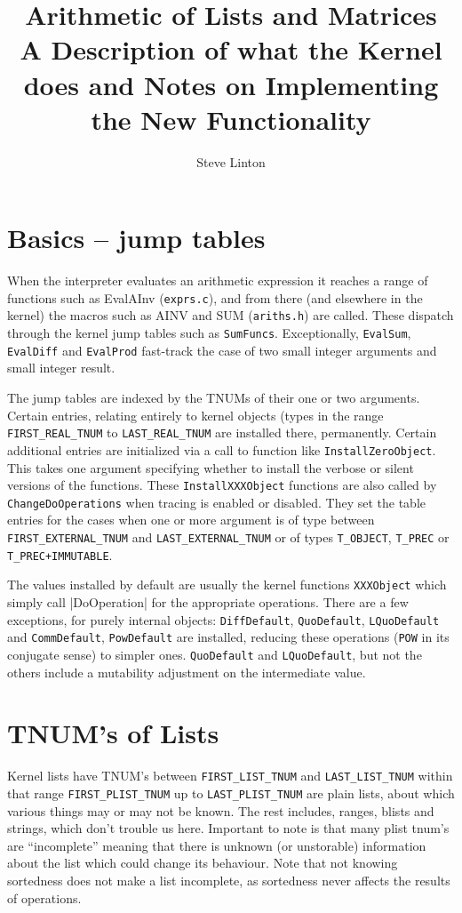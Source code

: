 \documentclass{article}
\title{Arithmetic of Lists and Matrices\\
A Description of what the Kernel does and Notes on Implementing the
New Functionality}
\author{Steve Linton}
\begin{document}
\maketitle
\section{Basics -- jump tables}

When the interpreter evaluates an arithmetic expression it reaches a
range of functions such as EvalAInv (\verb|exprs.c|), and from there
(and elsewhere in the kernel) the macros such as AINV and SUM
(\verb|ariths.h|) are called. These dispatch through the kernel jump
tables such as \verb|SumFuncs|. Exceptionally, \verb|EvalSum|, \verb|EvalDiff| and
\verb|EvalProd| fast-track the case of two small integer arguments and
small integer result. 

The jump tables  are indexed by the TNUMs of their
one or two arguments. Certain entries, relating entirely to kernel
objects (types in the range \verb|FIRST_REAL_TNUM| to
\verb|LAST_REAL_TNUM| are installed there, permanently. 
Certain additional entries are initialized via a call to function like
\verb|InstallZeroObject|. This takes one argument specifying whether
to install the verbose or silent versions of the functions. These
\verb|InstallXXXObject| functions are also called by
\verb|ChangeDoOperations| when tracing is enabled or disabled. They
set the table entries for the cases when one or more argument  is of
type between \verb|FIRST_EXTERNAL_TNUM| and \verb|LAST_EXTERNAL_TNUM|
or of types \verb|T_OBJECT|, \verb|T_PREC| or \verb|T_PREC+IMMUTABLE|.


The values installed by default are usually the kernel functions
\verb|XXXObject| which simply call |DoOperation| for the appropriate
operations. There are a few exceptions, for purely internal objects:
\verb|DiffDefault|, \verb|QuoDefault|, \verb|LQuoDefault| and
\verb|CommDefault|, \verb|PowDefault|  are installed, reducing these
operations (\verb|POW| in its conjugate sense) to simpler
ones. \verb|QuoDefault| and \verb|LQuoDefault|, but not the others
include a mutability adjustment on the intermediate value.

\section{TNUM's of Lists}

Kernel lists have TNUM's between \verb|FIRST_LIST_TNUM| and
\verb|LAST_LIST_TNUM| within that range \verb|FIRST_PLIST_TNUM| up to
\verb|LAST_PLIST_TNUM| are plain lists, about which various things may
or may not be known. The rest includes, ranges, blists and strings,
which don't trouble us here.  Important to note is that many plist
tnum's are ``incomplete'' meaning that there is unknown (or
unstorable) information about the list which could change its
behaviour. Note that not knowing sortedness does not make a list
incomplete, as sortedness never affects the results of operations.
\end{document}
